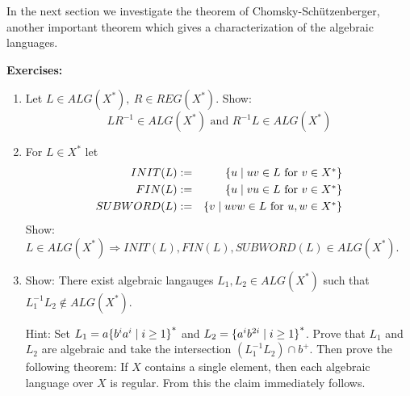 In the next section we investigate the theorem of Chomsky-Schützenberger,
another important theorem which gives a characterization of the algebraic languages.

{\bf Exercises:}

\begin{enumerate}
  \item Let $L\in ALG(X^*),\ R\in REG(X^*)$. Show:
  \[ LR^{-1}\in ALG(X^*)\text{ and }R^{-1}L\in ALG(X^*) \]
  
  \item For $L\in X^*$ let
  \begin{eqnarray*}
  INIT(L) &:=& \mbox{$\{u\mid uv\in L\text{ for }v\in X^*\}$}\\
  FIN(L) &:=& \mbox{$\{u\mid vu\in L\text{ for }v\in X^*\}$}\\
  SUBWORD(L) &:=& \mbox{$\{v\mid uvw\in L\text{ for }u,w\in X^*\}$}
  \end{eqnarray*}
  Show: $L\in ALG(X^*) \Rightarrow INIT(L), FIN(L), SUBWORD(L)\in ALG(X^*)$.
  
  \item Show: There exist algebraic langauges $L_1, L_2\in ALG(X^*)$ such that
  $L_1^{-1} L_2 \notin ALG(X^*)$.
  
  Hint: Set $L_1 = a \mbox{$\{b^ia^i\mid i\geq 1\}$}^*$ and $L_2 =
  \mbox{$\{a^{i}b^{2i}\mid i\geq 1\}$}^*$. Prove that $L_1$ and $L_2$ are algebraic
  and take the intersection $(L_1^{-1}L_2)\cap b^+$. Then prove the following
  theorem: If $X$ contains a single element, then each algebraic language over
  $X$ is regular. From this the claim immediately follows.
\end{enumerate}
